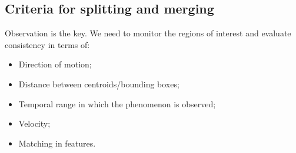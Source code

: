 \subsection{Criteria for splitting and merging}
Observation is the key. We need to monitor the regions of interest and evaluate consistency in terms of:
\begin{itemize}
    \item Direction of motion;
    \item Distance between centroids/bounding boxes;
    \item Temporal range in which the phenomenon is observed;
    \item Velocity;
    \item Matching in features.
\end{itemize}

